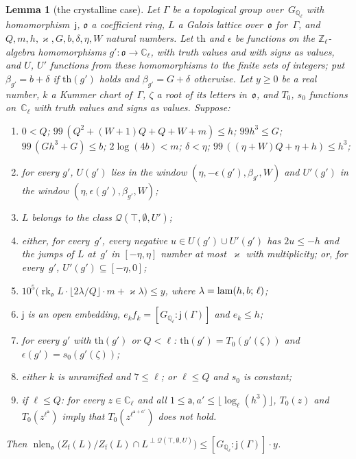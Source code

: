 \documentclass[11pt,a4paper]{article}
\newcommand{\m}[1]{\mbox{$#1$}}        %
\theoremstyle{plainx}
\newtheorem{lemma}[theorem]{Lemma}
\theoremstyle{uprightx}
\newcommand{\Zl}{\mathbb{Z}_\ell}
\newcommand{\Cl}{\mathbb{C}_\ell}
\newcommand{\Gl}{G_{\mathbb{Q}_\ell}}
\newcommand{\nlen}{\operatorname{nlen}}
\newcommand{\fo}{\mathfrak{o}}
\newcommand{\rk}{\operatorname{rk}}
\newcommand{\Zf}{Z_{\mathrm{f}}}
\begin{document}
\begin{lemma}[the crystalline case]\label{l:crys}
Let $\Gamma$ be a topological group over~\m{\Gl} with homomorphism~$\mathsf{j}$, $\fo$ a coefficient ring, $L$ a Galois
lattice over~$\fo$ for~$\Gamma$, and \m{Q,m,h,\varkappa,G,b,\delta,\eta,W} natural numbers. Let \m{\mathrm{th}} and
$\epsilon$ be functions on the \m{\Zl}-algebra homomorphisms \m{g'\colon\fo\to\Cl}, with truth values and with
signs as values, and $U$, $U'$ functions from these homomorphisms to the finite sets of integers; put
\m{\beta_{g'}=b+\delta} if \m{\mathrm{th}(g')} holds and \m{\beta_{g'}=G+\delta} otherwise. Let \m{y\ge0} be a real number,
$k$ a Kummer chart of~$\Gamma$, $\zeta$ a root of its letters in~$\fo$, and \m{T_0}, \m{s_0} functions on~\m{\Cl}
with truth values and signs as values. Suppose:
\begin{enumerate}[label=\textup{(\alph*)},leftmargin=2.3em,itemsep=1pt]
\item $0<Q$; $99\,(Q^2+(W+1)Q+Q+W+m)\le h$; $99h^3\le G$; $99\,(Gh^3+G)\le b$; $2\log(4b)<m$;
$\delta<\eta$; $99\,((\eta+W)Q+\eta+h)\le h^3$;
\item for every $g'$, \m{U(g')} lies in the window \m{(\eta,-\epsilon(g'),\beta_{g'},W)} and \m{U'(g')} in the window
\m{(\eta,\epsilon(g'),\beta_{g'},W)};
\item $L$ belongs to the class \m{\mathcal{Q}(\top,\emptyset,U')};
\item either, for every~$g'$, every negative \m{u\in U(g')\cup U'(g')} has \m{2u\le-h} and the jumps of $L$ at~$g'$ in
\m{[-\eta,\eta]} number at most~$\varkappa$ with multiplicity; or, for every~$g'$, \m{U'(g')\subseteq[-\eta,0]};
\item \m{10^{5}\bigl(\rk_{\fo}L\cdot\lfloor2\lambda/Q\rfloor\cdot m+\varkappa\lambda\bigr)\le y}, where
\m{\lambda=\lambdaLoss{h}{b}{\ell}};
\item $\mathsf{j}$ is an open embedding, \m{e_kf_k=[\Gl:\mathsf{j}(\Gamma)]} and \m{e_k\le h};
\item for every $g'$ with \m{\mathrm{th}(g')} or \m{Q<\ell}: \m{\mathrm{th}(g')=T_0(g'(\zeta))} and
\m{\epsilon(g')=s_0(g'(\zeta))};
\item either $k$ is unramified and \m{7\le\ell}; or \m{\ell\le Q} and $s_0$ is constant;
\item if \m{\ell\le Q}: for every \m{z\in\Cl} and all \m{1\le \mathsf{a},a'\le\lfloor\log_\ell(h^3)\rfloor}, \m{T_0(z)} and
\m{T_0(z^{\ell^{\mathsf{a}}})} imply that \m{T_0(z^{\ell^{\mathsf{a}+a'}})} does not hold.
\end{enumerate}
Then \m{\nlen_{\fo}\bigl(\Zf(L)/\Zf(L)\cap L^{\perp\mathcal{Q}(\top,\emptyset,U)}\bigr)\le[\Gl:\mathsf{j}(\Gamma)]\cdot y}.
\end{lemma}
\end{document}

